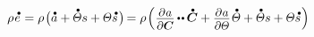 \nopagebreak\vspace{1.2em}\begin{equation*}
\rho \hspace{.15ex} \mathdotabove{e} \hspace{.12ex}
= \rho \hspace{.2ex} \bigl( \mathdotabove{a}
+ \mathdotabove{\temperaturefield} s + \temperaturefield \mathdotabove{s}
\hspace{.2ex} \bigr) \hspace{-0.25ex}
= \rho \hspace{.2ex} \Bigl( \hspace{.1ex}
\tikzmark{beginFreeEnergyTimeDerivative} \scalebox{0.92}[0.92]{$ \displaystyle \frac{\raisemath{-0.2em}{\partial\hspace{.1ex} a}}{\partial \bm{C}}$}
\hspace{-0.15ex} \dotdotp \hspace{-0.1ex} \mathdotabove{\bm{C}}
+ \tikzmark{beginEntropyAsDerivative} \scalebox{0.92}[0.92]{$ \displaystyle \frac{\raisemath{-0.2em}{\partial\hspace{.1ex} a}}{\partial \temperaturefield}$}
\hspace{.2ex} \mathdotabove{\temperaturefield} \hspace{-0.33ex} \tikzmark{endFreeEnergyTimeDerivative} \hspace{.33ex}
+ \mathdotabove{\temperaturefield} s \tikzmark{endEntropyAsDerivative}
+ \temperaturefield \mathdotabove{s}
\hspace{.15ex} \Bigr)
\end{equation*}%
%


